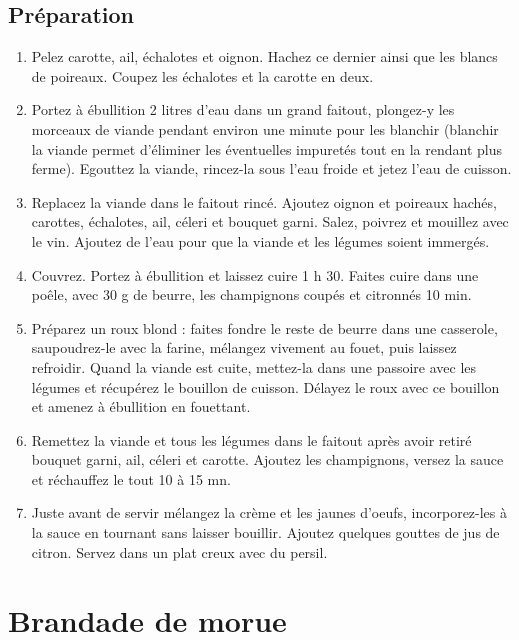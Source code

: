 \subsection*{Préparation}
\begin{enumerate}
\item Pelez carotte, ail, échalotes et oignon. Hachez ce dernier ainsi que les blancs de poireaux. Coupez les échalotes et la carotte en deux.

\item Portez à ébullition 2 litres d'eau dans un grand faitout, plongez-y les morceaux de viande pendant environ une minute pour les blanchir (blanchir la viande permet d'éliminer les éventuelles impuretés tout en la rendant plus ferme). Egouttez la viande, rincez-la sous l'eau froide et jetez l'eau de cuisson.

\item Replacez la viande dans le faitout rincé. Ajoutez oignon et poireaux hachés, carottes, échalotes, ail, céleri et bouquet garni. Salez, poivrez et mouillez avec le vin. Ajoutez de l'eau pour que la viande et les légumes soient immergés.

\item Couvrez. Portez à ébullition et laissez cuire 1 h 30. Faites cuire dans une poêle, avec 30 g de beurre, les champignons coupés et citronnés 10 min.

\item Préparez un roux blond : faites fondre le reste de beurre dans une casserole, saupoudrez-le avec la farine, mélangez vivement au fouet, puis laissez refroidir. Quand la viande est cuite, mettez-la dans une passoire avec les légumes et récupérez le bouillon de cuisson. Délayez le roux avec ce bouillon et amenez à ébullition en fouettant.

\item Remettez la viande et tous les légumes dans le faitout après avoir retiré bouquet garni, ail, céleri et carotte. Ajoutez les champignons, versez la sauce et réchauffez le tout 10 à 15 mn.

\item Juste avant de servir mélangez la crème et les jaunes d'oeufs, incorporez-les à la sauce en tournant sans laisser bouillir. Ajoutez quelques gouttes de jus de citron. Servez dans un plat creux avec du persil.
\end{enumerate}



\newpage
\section{Brandade de morue}
